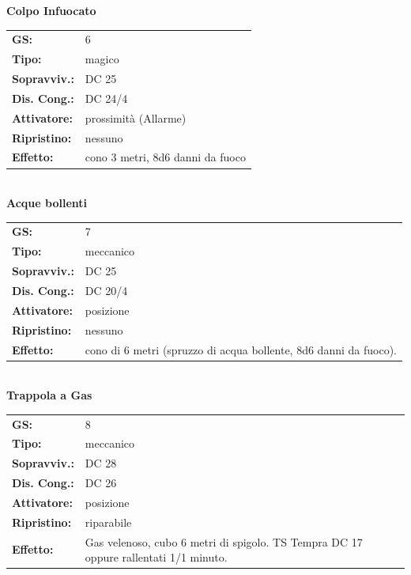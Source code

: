 \begin{multicols}{2}
\textbf{Colpo Infuocato}

\begin{tabularx}{0.48\textwidth}{lX}
	\textbf{GS:} & 6 \\
	\textbf{Tipo:} & magico \\
	\textbf{Sopravviv.:} & DC 25 \\
	\textbf{Dis. Cong.:} & DC 24/4 \\
	\textbf{Attivatore:} & prossimità (Allarme) \\
	\textbf{Ripristino:} & nessuno \\
	\textbf{Effetto:} & cono 3 metri, 8d6 danni da fuoco
\end{tabularx}\\

%

\textbf{Acque bollenti}

\begin{tabularx}{0.48\textwidth}{lX}
	\textbf{GS:} & 7 \\
	\textbf{Tipo:} & meccanico \\
	\textbf{Sopravviv.:} & DC 25 \\
	\textbf{Dis. Cong.:} & DC 20/4 \\
	\textbf{Attivatore:} & posizione \\
	\textbf{Ripristino:} & nessuno \\
	\textbf{Effetto:} & cono di 6 metri (spruzzo di acqua bollente, 8d6 danni da fuoco). 
\end{tabularx}\\

\textbf{Trappola a Gas}

\begin{tabularx}{0.48\textwidth}{lX}
	\textbf{GS:} & 8 \\
	\textbf{Tipo:} & meccanico \\
	\textbf{Sopravviv.:} & DC 28 \\
	\textbf{Dis. Cong.:} & DC 26 \\
	\textbf{Attivatore:} & posizione \\
	\textbf{Ripristino:} & riparabile \\
	\textbf{Effetto:} & Gas velenoso, cubo 6 metri di spigolo. TS Tempra DC 17 oppure rallentati 1/1 minuto.
\end{tabularx}\\


\end{multicols}
